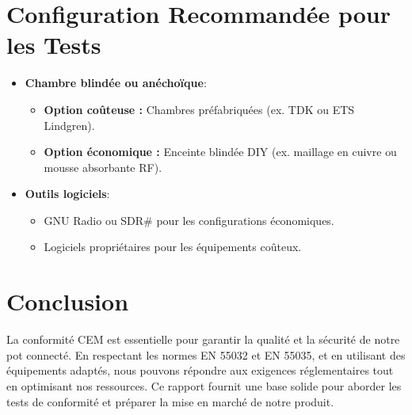 \documentclass[a4paper,12pt]{article}
\begin{document}
\section{Configuration Recommandée pour les Tests}
\begin{itemize}
    \item \textbf{Chambre blindée ou anéchoïque}:
          \begin{itemize}
              \item \textbf{Option coûteuse :} Chambres préfabriquées (ex. TDK ou ETS Lindgren).
              \item \textbf{Option économique :} Enceinte blindée DIY (ex. maillage en cuivre ou mousse absorbante RF).
          \end{itemize}
    \item \textbf{Outils logiciels}:
          \begin{itemize}
              \item GNU Radio ou SDR\# pour les configurations économiques.
              \item Logiciels propriétaires pour les équipements coûteux.
          \end{itemize}
\end{itemize}

\section*{Conclusion}
La conformité CEM est essentielle pour garantir la qualité et la sécurité de notre pot connecté. En respectant les normes EN 55032 et EN 55035, et en utilisant des équipements adaptés, nous pouvons répondre aux exigences réglementaires tout en optimisant nos ressources. Ce rapport fournit une base solide pour aborder les tests de conformité et préparer la mise en marché de notre produit.
\end{document}

